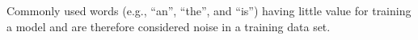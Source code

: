 \begin{definition}
  Commonly used words (e.g., ``an'', ``the'', and ``is'') having little
  value for training a model and are therefore considered noise in a training
  data set.
  \label{def:stop:words}
\end{definition}





